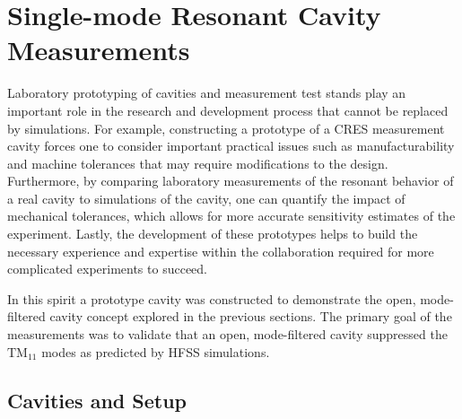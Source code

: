 \section{Single-mode Resonant Cavity Measurements}
\label{sec:chap6-single-mode-cavity-measurement}

Laboratory prototyping of cavities and measurement test stands play an important role in the research and development process that cannot be replaced by simulations. For example, constructing a prototype of a CRES measurement cavity forces one to consider important practical issues such as manufacturability and machine tolerances that may require modifications to the design. Furthermore, by comparing laboratory measurements of the resonant behavior of a real cavity to simulations of the cavity, one can quantify the impact of mechanical tolerances, which allows for more accurate sensitivity estimates of the experiment. Lastly, the development of these prototypes helps to build the necessary experience and expertise within the collaboration required for more complicated experiments to succeed.

In this spirit a prototype cavity was constructed to demonstrate the open, mode-filtered cavity concept explored in the previous sections. The primary goal of the measurements was to validate that an open, mode-filtered cavity suppressed the $\mathrm{TM}_{11}$ modes as predicted by HFSS simulations.

\subsection{Cavities and Setup}

